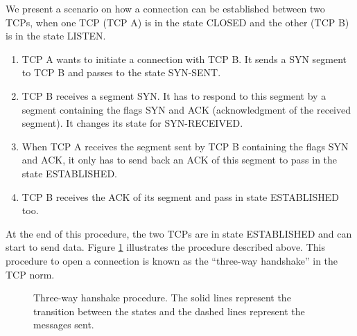 \documentclass[a4paper, 10pt]{article}
\let\state\textsf
\newcommand\ESTABLISHED{\state{ESTABLISHED}}
\newcommand\SYNRECEIVED{\state{SYN-RECEIVED}}
\newcommand\CLOSED{\state{CLOSED}}
\newcommand\LISTEN{\state{LISTEN}}
\newcommand\SYNSENT{\state{SYN-SENT}}
\begin{document}
    We present a scenario on how a connection can be established between two TCPs,
    when one TCP (TCP A) is in the state \CLOSED{} and the other (TCP B) is in the state \LISTEN.
    \begin{enumerate}
        \item TCP A wants to initiate a connection with TCP B. It sends a SYN segment to
            TCP B and passes to the state \SYNSENT{}.

        \item TCP B receives a segment SYN. It has to respond to this segment by a segment
            containing the flags SYN and ACK (acknowledgment of the received segment).
            It changes its state for \SYNRECEIVED. 

        \item When TCP A receives the segment sent by TCP B containing the flags SYN and ACK,
            it only has to send back an ACK of this segment to pass in the state \ESTABLISHED.

        \item TCP B receives the ACK of its segment and pass in state \ESTABLISHED{} too.
    \end{enumerate}
    At the end of this procedure, the two TCPs are in state \ESTABLISHED{} and can start to
    send data. Figure \ref{fig:handshake} illustrates the procedure described above. This procedure to open a connection is known as the ``three-way
    handshake'' in the TCP norm.

    \begin{figure}
        \centering
        \par
        \caption{Three-way hanshake procedure. The solid lines represent the transition between
        the states and the dashed lines represent the messages sent.}
        \label{fig:handshake}
    \end{figure}
\end{document}
